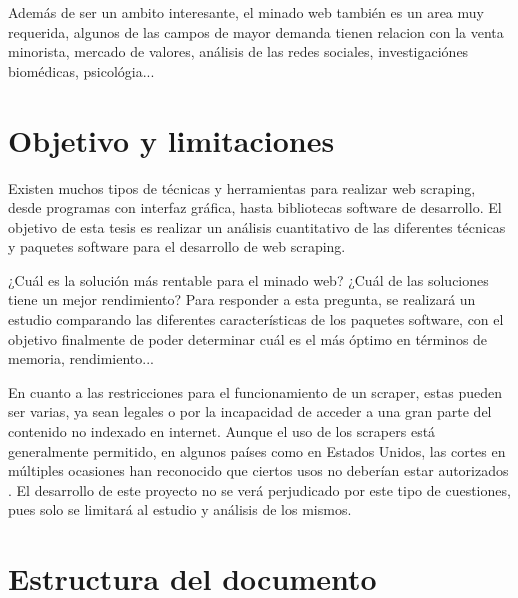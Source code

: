 Además de ser un ambito interesante, el minado web también es un area muy requerida, algunos de las campos 
de mayor demanda tienen relacion con la venta minorista, mercado de valores, análisis de las redes sociales, 
investigaciónes biomédicas, psicológia...

\section{Objetivo y limitaciones}
\label{sec:objetivo y limitaciones}

Existen muchos tipos de técnicas y herramientas para realizar web scraping, desde programas con interfaz
gráfica, hasta bibliotecas software de desarrollo. El objetivo de esta tesis es realizar un análisis
cuantitativo de las diferentes técnicas y paquetes software para el desarrollo de web scraping.

¿Cuál es la solución más rentable para el minado web? ¿Cuál de las soluciones tiene un mejor rendimiento?
Para responder a esta pregunta, se realizará un estudio comparando las diferentes características de los
paquetes software, con el objetivo finalmente de poder determinar cuál es el más óptimo en términos de
memoria, rendimiento...

En cuanto a las restricciones para el funcionamiento de un scraper, estas pueden ser varias, ya sean legales 
o por la incapacidad de acceder a una gran parte del contenido no indexado en internet. Aunque el uso de 
los scrapers está generalmente permitido, en algunos países como en Estados Unidos, las cortes en múltiples
ocasiones han reconocido que ciertos usos no deberían estar autorizados \cite{web-scraping-wikipedia}.
El desarrollo de este proyecto no se verá perjudicado por este tipo de cuestiones, pues solo se limitará
al estudio y análisis de los mismos.

\section{Estructura del documento}
\label{sec:estructura del documento}

